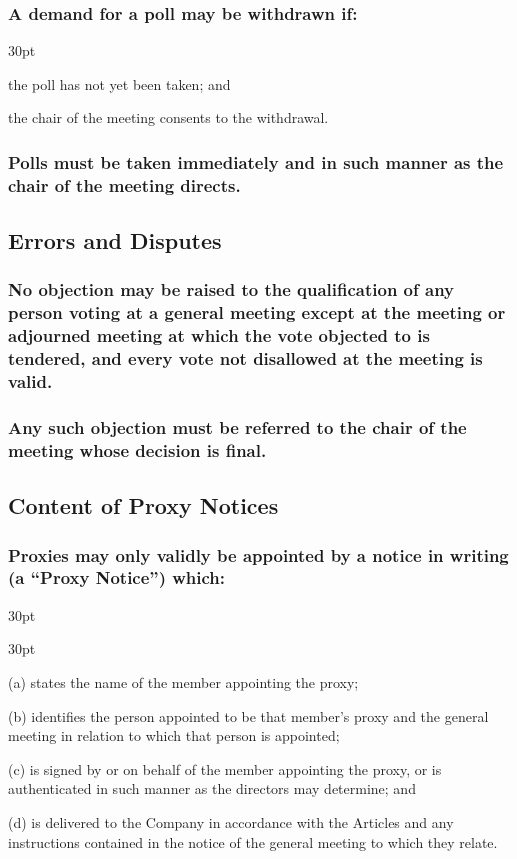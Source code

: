 \documentclass[12pt]{article}
\def\clauseindent{30pt}
\newenvironment{subindentpara}{\raggedright\begin{adjustwidth}{\clauseindent}{}\begin{hanginglist}}{\end{hanginglist}\end{adjustwidth}}
\newenvironment{subindentlist}{\raggedright\begin{adjustwidth}{\clauseindent}{}\begin{labeledlist}{\clauseindent}}{\end{labeledlist}\end{adjustwidth}}
\begin{document}
\subsubsection[Specifics of Withdrawal of Poll Demand]{A demand for a poll may be withdrawn if:}
\begin{subindentpara}
    \item the poll has not yet been taken; and
    \item the chair of the meeting consents to the withdrawal.
\end{subindentpara}
\subsubsection[Polls to be Taken Immediately]{Polls must be taken immediately and in such manner as the chair of the meeting directs.}

\subsection{Errors and Disputes}
\subsubsection[Disputes and Errors of Qualification]{No objection may be raised to the qualification of any person voting at a general meeting except at the meeting or adjourned meeting at which the vote objected to is tendered, and every vote not disallowed at the meeting is valid.}
\subsubsection[Decisions on Disputes and Errors of Qualification]{Any such objection must be referred to the chair of the meeting whose decision is final.}

\subsection{Content of Proxy Notices}\label{subsection:proxycont}
\subsubsection[Specifics of Content of Proxy Notices]{Proxies may only validly be appointed by a notice in writing (a ``Proxy Notice'') which:}
\begin{subindentlist}
    \item [(a)] states the name of the member appointing the proxy;
    \item [(b)] identifies the person appointed to be that member's proxy and the general meeting in relation to which that person is appointed;
    \item [(c)] is signed by or on behalf of the member appointing the proxy, or is authenticated in such manner as the directors may determine; and
    \item [(d)] is delivered to the Company in accordance with the Articles and any instructions contained in the notice of the general meeting to which they relate.
\end{subindentlist}
\end{document}
